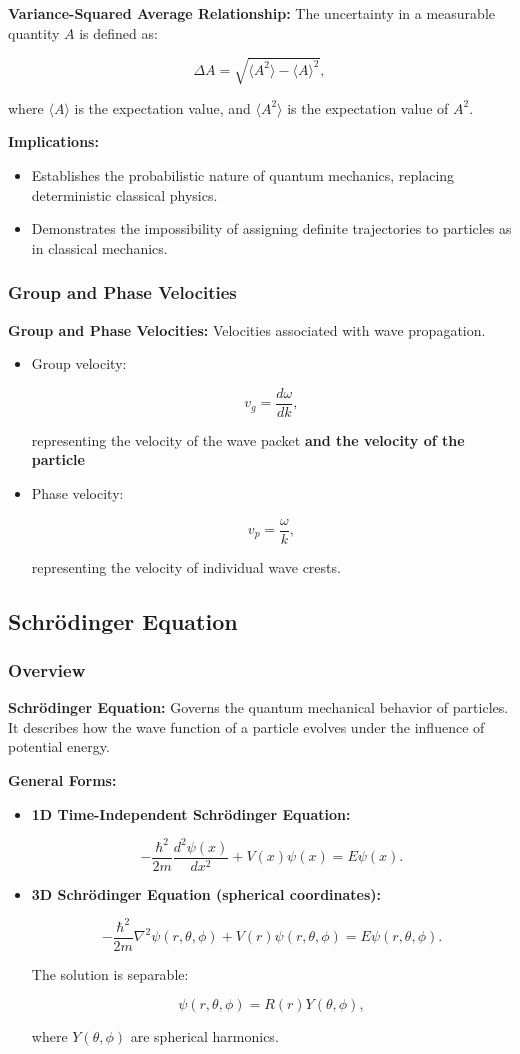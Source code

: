 \documentclass{article}
\newcommand{\eqbox}[1]{\begin{tcolorbox}[colback=gray!10] #1 \end{tcolorbox}}
\newcommand{\conceptbox}[1]{\begin{tcolorbox}[colback=blue!10] #1 \end{tcolorbox}}
\begin{document}
\conceptbox{
\textbf{Variance-Squared Average Relationship:}
The uncertainty in a measurable quantity \( A \) is defined as:
\eqbox{
\[
\Delta A = \sqrt{\langle A^2 \rangle - \langle A \rangle^2},
\]
}
where \( \langle A \rangle \) is the expectation value, and \( \langle A^2 \rangle \) is the expectation value of \( A^2 \).
}

\conceptbox{
\textbf{Implications:}
\begin{itemize}
    \item Establishes the probabilistic nature of quantum mechanics, replacing deterministic classical physics.
    \item Demonstrates the impossibility of assigning definite trajectories to particles as in classical mechanics.
\end{itemize}
}

\subsubsection{Group and Phase Velocities}
\conceptbox{
\textbf{Group and Phase Velocities:}
Velocities associated with wave propagation.
\begin{itemize}
    \item Group velocity:
    \eqbox{
    \[
    v_g = \frac{d\omega}{dk},
    \]
    }
    representing the velocity of the wave packet \textbf{and the velocity of the particle}
    \item Phase velocity:
    \eqbox{
    \[
    v_p = \frac{\omega}{k},
    \]
    }
    representing the velocity of individual wave crests.
\end{itemize}
}


\subsection{Schrödinger Equation}

\subsubsection{Overview}
\conceptbox{
\textbf{Schrödinger Equation:} Governs the quantum mechanical behavior of particles. It describes how the wave function of a particle evolves under the influence of potential energy.

\textbf{General Forms:}
\begin{itemize}
    \item \textbf{1D Time-Independent Schrödinger Equation:}
    \eqbox{
    \[
    -\frac{\hbar^2}{2m} \frac{d^2\psi(x)}{dx^2} + V(x)\psi(x) = E\psi(x).
    \]}
    \item \textbf{3D Schrödinger Equation (spherical coordinates):}
    \eqbox{
    \[
    -\frac{\hbar^2}{2m} \nabla^2 \psi(r, \theta, \phi) + V(r)\psi(r, \theta, \phi) = E\psi(r, \theta, \phi).
    \]}
    The solution is separable:
    \eqbox{
    \[
    \psi(r, \theta, \phi) = R(r)Y(\theta, \phi),
    \]}
    where \( Y(\theta, \phi) \) are spherical harmonics.
\end{itemize}
}
\end{document}
